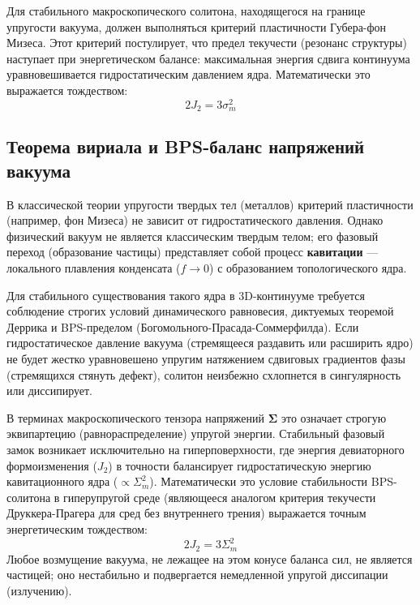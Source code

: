 \documentclass[12pt,a4paper]{article}
\begin{document}
	Для стабильного макроскопического солитона, находящегося на границе упругости вакуума, должен выполняться критерий пластичности Губера-фон Мизеса. Этот критерий постулирует, что предел текучести (резонанс структуры) наступает при энергетическом балансе: максимальная энергия сдвига континуума уравновешивается гидростатическим давлением ядра. Математически это выражается тождеством:
	\begin{equation}
		2 J_2 = 3 \sigma_m^2
	\end{equation}
	
	\subsection{Теорема вириала и BPS-баланс напряжений вакуума}
	В классической теории упругости твердых тел (металлов) критерий пластичности (например, фон Мизеса) не зависит от гидростатического давления. Однако физический вакуум не является классическим твердым телом; его фазовый переход (образование частицы) представляет собой процесс \textbf{кавитации} — локального плавления конденсата ($f \to 0$) с образованием топологического ядра.
	
	Для стабильного существования такого ядра в 3D-континууме требуется соблюдение строгих условий динамического равновесия, диктуемых теоремой Деррика и BPS-пределом (Богомольного-Прасада-Соммерфилда). Если гидростатическое давление вакуума (стремящееся раздавить или расширить ядро) не будет жестко уравновешено упругим натяжением сдвиговых градиентов фазы (стремящихся стянуть дефект), солитон неизбежно схлопнется в сингулярность или диссипирует.
	
	В терминах макроскопического тензора напряжений $\boldsymbol{\Sigma}$ это означает строгую эквипартецию (равнораспределение) упругой энергии. Стабильный фазовый замок возникает исключительно на гиперповерхности, где энергия девиаторного формоизменения ($J_2$) в точности балансирует гидростатическую энергию кавитационного ядра ($\propto \Sigma_m^2$). 
	Математически это условие стабильности BPS-солитона в гиперупругой среде (являющееся аналогом критерия текучести Друккера-Прагера для сред без внутреннего трения) выражается точным энергетическим тождеством:
	\begin{equation}
		2 J_2 = 3 \Sigma_m^2
	\end{equation}
	Любое возмущение вакуума, не лежащее на этом конусе баланса сил, не является частицей; оно нестабильно и подвергается немедленной упругой диссипации (излучению).
	
\end{document}

